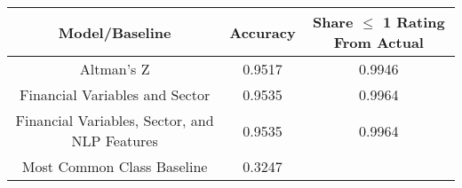 \footnotesize
\begin{tabular}{ccc}
\toprule
Model/Baseline & Accuracy & Share $\le$ 1 Rating From Actual \\
\midrule
Altman's Z & 0.9517 & 0.9946 \\
Financial Variables and Sector & 0.9535 & 0.9964 \\
Financial Variables, Sector, and NLP Features & 0.9535 & 0.9964 \\
Most Common Class Baseline & 0.3247 &  \\
\bottomrule
\end{tabular}

\normalsize